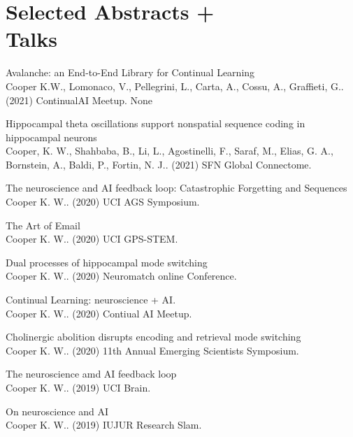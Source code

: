 \documentclass[10pt]{cooperCV2}
\begin{document}
\section{Selected Abstracts +  \\Talks}

 
\begin{etaremune}[itemindent=-1.5\bibhang, topsep=0pt,
				   itemsep=\bibsep,partopsep=0pt,parsep=0pt,leftmargin={\bibhang+\widthof{[999]}}] 
    
    \item Avalanche: an End-to-End Library for Continual Learning\\ Cooper K.W., Lomonaco, V., Pellegrini, L., Carta, A., Cossu, A., Graffieti, G.. (2021) ContinualAI Meetup. None
     
	
    \item Hippocampal theta oscillations support nonspatial sequence coding in hippocampal neurons\\ Cooper, K. W., Shahbaba, B., Li, L., Agostinelli, F., Saraf, M., Elias, G. A., Bornstein, A., Baldi, P.,  Fortin, N. J.. (2021) SFN Global Connectome. 
     
	
    \item The neuroscience and AI feedback loop: Catastrophic Forgetting and Sequences\\ Cooper K. W.. (2020) UCI AGS Symposium. 
     
	
    \item The Art of Email\\ Cooper K. W.. (2020) UCI GPS-STEM. 
     
	
    \item Dual processes of hippocampal mode switching\\ Cooper K. W.. (2020) Neuromatch online Conference. 
     
	
    \item Continual Learning: neuroscience + AI.\\ Cooper K. W.. (2020) Contiual AI Meetup. 
     
	
    \item Cholinergic abolition disrupts encoding and retrieval mode switching\\ Cooper K. W.. (2020) 11th Annual Emerging Scientists Symposium. 
     
	
    \item The neuroscience amd AI feedback loop\\ Cooper K. W.. (2019) UCI Brain. 
     
	
    \item On neuroscience and AI\\ Cooper K. W.. (2019) IUJUR Research Slam. 
     

\end{etaremune}
\end{document}
